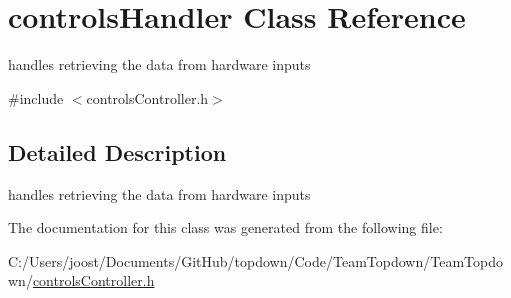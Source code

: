 \hypertarget{classcontrols_handler}{}\section{controls\+Handler Class Reference}
\label{classcontrols_handler}


handles retrieving the data from hardware inputs  




{\ttfamily \#include $<$controls\+Controller.\+h$>$}



\subsection{Detailed Description}
handles retrieving the data from hardware inputs 

The documentation for this class was generated from the following file\+:\begin{DoxyCompactItemize}
\item 
C\+:/\+Users/joost/\+Documents/\+Git\+Hub/topdown/\+Code/\+Team\+Topdown/\+Team\+Topdown/\hyperlink{controls_controller_8h}{controls\+Controller.\+h}\end{DoxyCompactItemize}
